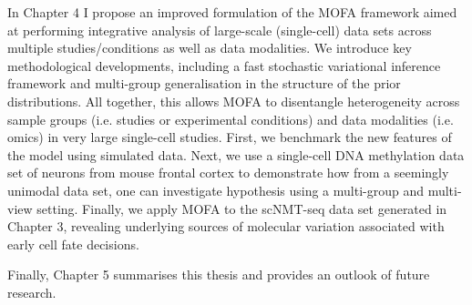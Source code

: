 In Chapter 4 I propose an improved formulation of the MOFA framework aimed at performing integrative analysis of large-scale (single-cell) data sets across multiple studies/conditions as well as data modalities. We introduce key methodological developments, including a fast stochastic variational inference framework and multi-group generalisation in the structure of the prior distributions. All together, this allows MOFA to  disentangle heterogeneity across sample groups (i.e. studies or experimental conditions) and data modalities (i.e. omics) in very large single-cell studies. First, we benchmark the new features of the model using simulated data. Next, we use a single-cell DNA methylation data set of neurons from mouse frontal cortex to demonstrate how from a seemingly unimodal data set, one can investigate hypothesis using a multi-group and multi-view setting. Finally, we apply MOFA to the scNMT-seq data set generated in Chapter 3, revealing underlying sources of molecular variation associated with early cell fate decisions.

Finally, Chapter 5 summarises this thesis and provides an outlook of future research.